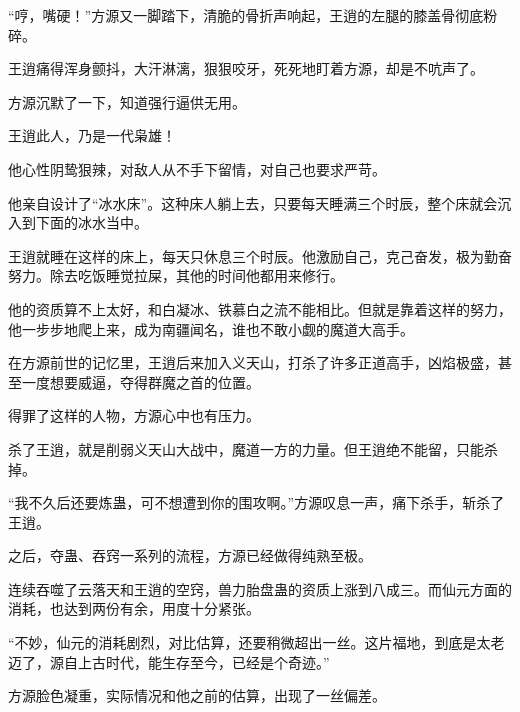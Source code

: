 \begin{this_body}
“哼，嘴硬！”方源又一脚踏下，清脆的骨折声响起，王逍的左腿的膝盖骨彻底粉碎。

王逍痛得浑身颤抖，大汗淋漓，狠狠咬牙，死死地盯着方源，却是不吭声了。

方源沉默了一下，知道强行逼供无用。

王逍此人，乃是一代枭雄！

他心性阴鸷狠辣，对敌人从不手下留情，对自己也要求严苛。

他亲自设计了“冰水床”。这种床人躺上去，只要每天睡满三个时辰，整个床就会沉入到下面的冰水当中。

王逍就睡在这样的床上，每天只休息三个时辰。他激励自己，克己奋发，极为勤奋努力。除去吃饭睡觉拉屎，其他的时间他都用来修行。

他的资质算不上太好，和白凝冰、铁慕白之流不能相比。但就是靠着这样的努力，他一步步地爬上来，成为南疆闻名，谁也不敢小觑的魔道大高手。

在方源前世的记忆里，王逍后来加入义天山，打杀了许多正道高手，凶焰极盛，甚至一度想要威逼，夺得群魔之首的位置。

得罪了这样的人物，方源心中也有压力。

杀了王逍，就是削弱义天山大战中，魔道一方的力量。但王逍绝不能留，只能杀掉。

“我不久后还要炼蛊，可不想遭到你的围攻啊。”方源叹息一声，痛下杀手，斩杀了王逍。

之后，夺蛊、吞窍一系列的流程，方源已经做得纯熟至极。

连续吞噬了云落天和王逍的空窍，兽力胎盘蛊的资质上涨到八成三。而仙元方面的消耗，也达到两份有余，用度十分紧张。

“不妙，仙元的消耗剧烈，对比估算，还要稍微超出一丝。这片福地，到底是太老迈了，源自上古时代，能生存至今，已经是个奇迹。”

方源脸色凝重，实际情况和他之前的估算，出现了一丝偏差。

\end{this_body}

